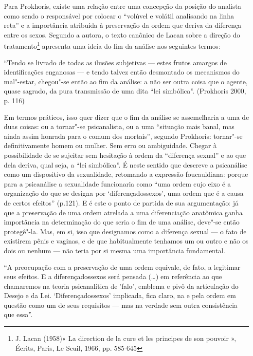 Para Prokhoris, existe uma relação entre uma concepção da posição do
analista como sendo o responsável por colocar o ``volúvel e volátil
analisando na linha reta'' e a importância atribuída à preservação da
ordem que deriva da diferença entre os sexos. Segundo a autora, o texto
canônico de Lacan sobre a direção do tratamento\footnote{J. Lacan
  (1958)« La direction de la cure et les principes de son pouvoir »,
  Écrits, Paris, Le Seuil, 1966, pp. 585-645} apresenta uma ideia do fim
da análise nos seguintes termos:

``Tendo se livrado de todas as ilusões subjetivas --- estes frutos
amargos de identificações enganosas --- e tendo talvez então desmontado
os mecanismos do mal"-estar, chegou"-se então ao fim da análise: a não
ser outra coisa que o agente, quase sagrado, da pura transmissão de uma
dita ``lei simbólica''. (Prokhoris 2000, p. 116)

Em termos práticos, isso quer dizer que o fim da análise se assemelharia
a uma de duas coisas: ou a tornar"-se psicanalista, ou a uma ``situação
mais banal, mas ainda assim honrada para o comum dos mortais'', segundo
Prokhoris: tornar"-se definitivamente homem ou mulher. Sem erro ou
ambiguidade. Chegar à possibilidade de se sujeitar sem hesitação à ordem
da ``diferença sexual'' e ao que dela deriva, qual seja, a ``lei
simbólica''. É neste sentido que descreve a psicanálise como um
dispositivo da sexualidade, retomando a expressão foucauldiana: porque
para a psicanálise a sexualidade funcionaria como ``uma ordem cujo eixo
é a organização do que se designa por `diferençadossexos', uma ordem
que é a causa de certos efeitos'' (p.121). E é este o ponto de partida
de sua argumentação: já que a preservação de uma ordem atrelada a uma
diferenciação anatômica ganha importância na determinação do que seria o
fim de uma análise, deve"-se então protegê"-la. Mas, em si, isso que
designamos como a diferença sexual --- o fato de existirem pênis e
vaginas, e de que habitualmente tenhamos um ou outro e não os dois ou
nenhum --- não teria por si mesma uma importância fundamental.

``A preocupação com a preservação de uma ordem equivale, de fato, a
legitimar seus efeitos. E a diferençadossexos será pensada (\ldots{})
em referência ao que chamaremos na teoria psicanalítica de 'falo',
emblema e pivô da articulação do Desejo e da Lei. `Diferençadossexos'
implicada, fica claro, na e pela ordem em questão como um de seus
requisitos --- mas na verdade sem outra consistência que essa''.

